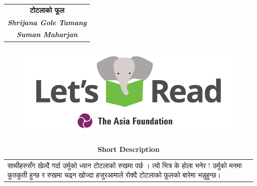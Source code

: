 \documentclass[
  letterpaper,
  DIV=11,
  numbers=noendperiod,
  paper=6in:9in,
  pagesize=pdftex,
  headinclude=on,
  footinclude=on,
  12pt]{scrreprt}
\begin{document}
\hypertarget{h2}{}
\begin{longtable}[]{@{}c@{}}
\toprule\noalign{}
\endhead
\bottomrule\noalign{}
\endlastfoot
\textbf{टोटलाको फूल} \\
\textbf{\emph{Shrijana Gole Tamang}} \\
\textbf{\emph{Suman Maharjan}} \\
\end{longtable}

\hypertarget{img}{}
\begin{figure}[H]

{\centering \includegraphics{images/letsread_asf.jpg}

}

\end{figure}

\begin{longtable}[]{@{}
  >{\raggedright\arraybackslash}p{}@{}}
\caption{\textbf{Short Description}}\tabularnewline
\toprule\noalign{}
\endfirsthead
\endhead
\bottomrule\noalign{}
\endlastfoot
साथीहरुसँग खेल्दै गर्दा उर्मुको ध्यान टोटलाको रुखमा पर्छ । त्यो भित्र के होला भनेर !
उर्मुको मनमा कुतकुती हुन्छ र रुखमा चढ्न खोज्दा हजुरआमाले रोक्दै टोटलाको फूलको बारेमा
भन्नुहुन्छ। \\
\end{longtable}


\hypertarget{section}{%
\chapter{}\label{section}}
\end{document}
